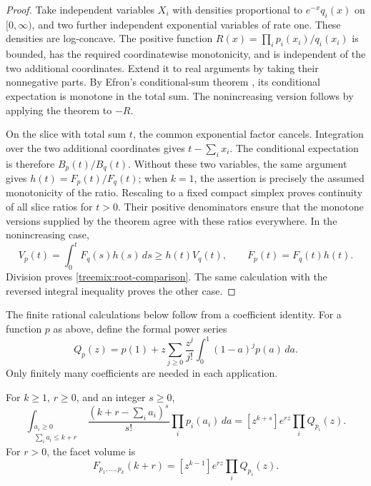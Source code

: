 \begin{proof}
Take independent variables $X_i$ with densities proportional to
$e^{-x}q_i(x)$ on $[0,\infty)$, and two further independent exponential
variables of rate one. These densities are log-concave. The positive function $R(x)=\prod_i p_i(x_i)/q_i(x_i)$ is bounded,
has the required coordinatewise monotonicity, and is independent of
the two additional coordinates. Extend it to real arguments by taking
their nonnegative parts. By Efron's conditional-sum theorem
\cite[Theorems~3.2--3.3]{saumardwellner2018}, its conditional expectation
is monotone in the total sum. The nonincreasing version follows
by applying the theorem to $-R$.

On the slice with total sum $t$, the common exponential factor cancels.
Integration over the two additional coordinates gives $t-\sum_i x_i$.
The conditional expectation is therefore $B_p(t)/B_q(t)$. Without
these two variables, the same argument gives $h(t)=F_p(t)/F_q(t)$;
when $k=1$, the assertion is precisely the assumed monotonicity of
the ratio. Rescaling to a fixed compact simplex proves continuity
of all slice ratios for $t>0$. Their positive denominators ensure that
the monotone versions supplied by the theorem agree with these ratios
everywhere. In the nonincreasing case,
\[
 V_p(t)=\int_0^t F_q(s)h(s)\,ds\ge h(t)V_q(t),\qquad
 F_p(t)=F_q(t)h(t).
\]
Division proves \eqref{treemix:root-comparison}. The same calculation
with the reversed integral inequality proves the other case.
\end{proof}

The finite rational calculations below follow from a coefficient
identity. For a function $p$ as above, define the formal power series
\begin{equation}\label{treemix:Q}
 Q_p(z)=p(1)+z\sum_{j\ge0}\frac{z^j}{j!}
                   \int_0^1(1-a)^jp(a)\,da.
\end{equation}
Only finitely many coefficients are needed in each application.

\begin{lemma}\label{treemix:coefficients}
For $k\ge1$, $r\ge0$, and an integer $s\ge0$,
\begin{equation}\label{treemix:split}
 \int_{\substack{a_i\ge0\\\sum_i a_i\le k+r}}
 \frac{(k+r-\sum_i a_i)^s}{s!}\prod_i p_i(a_i)\,da
 =[z^{k+s}]e^{rz}\prod_i Q_{p_i}(z).
\end{equation}
For $r>0$, the facet volume is
\[
 F_{p_1,\ldots,p_k}(k+r)=[z^{k-1}]e^{rz}\prod_i Q_{p_i}(z).
\]
\end{lemma}

